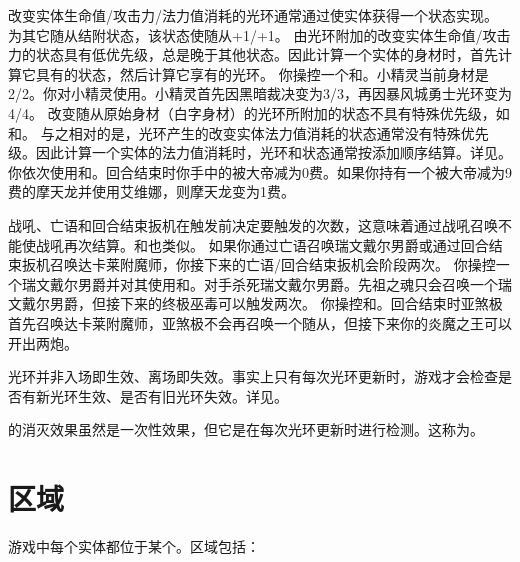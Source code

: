 改变实体生命值/攻击力/法力值消耗的光环通常通过使实体获得一个状态实现。
\example {}为其它随从结附状态，该状态使随从+1/+1。
\notice 由光环附加的改变实体生命值/攻击力的状态具有低优先级，总是晚于其他状态。因此计算一个实体的身材时，首先计算它具有的状态，然后计算它享有的光环。
\example 你操控一个和。小精灵当前身材是2/2。你对小精灵使用。小精灵首先因黑暗裁决变为3/3，再因暴风城勇士光环变为4/4。
\exception 改变随从原始身材（白字身材）的光环所附加的状态不具有特殊优先级，如和。
\notice 与之相对的是，光环产生的改变实体法力值消耗的状态通常没有特殊优先级。因此计算一个实体的法力值消耗时，光环和状态通常按添加顺序结算。详见。
\example 你依次使用和。回合结束时你手中的被大帝减为0费。如果你持有一个被大帝减为9费的摩天龙并使用艾维娜，则摩天龙变为1费。

战吼、亡语和回合结束扳机在触发前决定要触发的次数，这意味着通过战吼召唤不能使战吼再次结算。和也类似。
\notice 如果你通过亡语召唤瑞文戴尔男爵或通过回合结束扳机召唤达卡莱附魔师，你接下来的亡语/回合结束扳机会阶段两次。
\example 你操控一个瑞文戴尔男爵并对其使用和。对手杀死瑞文戴尔男爵。先祖之魂只会召唤一个瑞文戴尔男爵，但接下来的终极巫毒可以触发两次。
\example 你操控和。回合结束时亚煞极首先召唤达卡莱附魔师，亚煞极不会再召唤一个随从，但接下来你的炎魔之王可以开出两炮。

光环并非入场即生效、离场即失效。事实上只有每次光环更新时，游戏才会检查是否有新光环生效、是否有旧光环失效。详见。

的消灭效果虽然是一次性效果，但它是在每次光环更新时进行检测。这称为。

\section{区域}
\label{zone}

游戏中每个实体都位于某个。区域包括：

